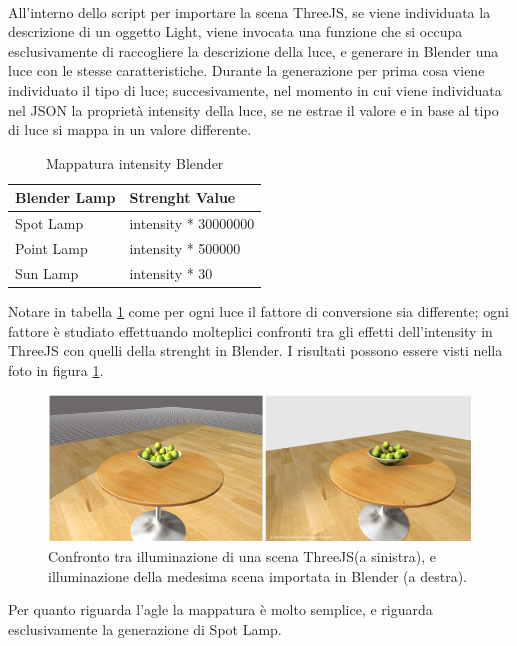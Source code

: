 \\ 
All’interno dello script per importare la scena ThreeJS, se viene individuata la descrizione di un oggetto Light, viene invocata una funzione che si occupa esclusivamente di raccogliere la descrizione della luce, e generare in Blender una luce con le stesse caratteristiche. Durante la generazione per prima cosa viene individuato il tipo di luce; succesivamente, nel momento in cui viene individuata nel JSON la proprietà intensity della luce, se ne estrae il valore e in base al tipo di luce si mappa in un valore differente.
\begin{table}[]
\centering
\caption{Mappatura intensity Blender}
\label{insensity_table}
\begin{tabular}{|l|l|}
\hline
\textbf{Blender Lamp} & \textbf{Strenght Value} \\ \hline
Spot Lamp & intensity * 30000000 \\ \hline
Point Lamp & intensity * 500000 \\ \hline
Sun Lamp & intensity * 30 \\ \hline
\end{tabular}
\end{table}
Notare in tabella \ref{insensity_table} come per ogni luce il fattore di conversione sia differente; ogni fattore è studiato effettuando molteplici confronti tra gli effetti dell’intensity in ThreeJS con quelli della strenght in Blender. I risultati possono essere visti nella foto in figura \ref{fig:ba_se_tavolini}. 
\\
\begin{figure}[htb]
 \centering
 \includegraphics[width=1\linewidth]{images/chapter_baking_service/ba_se_tavolini.png}\hfill
 \caption[Confronto intensity - strenght]{Confronto tra illuminazione di una scena ThreeJS(a sinistra), e illuminazione della medesima scena importata in Blender (a destra).}
 \label{fig:ba_se_tavolini}
\end{figure}
Per quanto riguarda l’agle la mappatura è molto semplice, e riguarda esclusivamente la generazione di Spot Lamp.
\\
